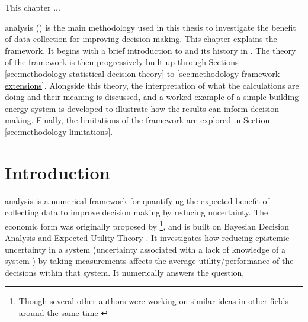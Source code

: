 \begin{cbox}{}
    This chapter ...\\


\end{cbox}

\newpage

\noindent
{} analysis () is the main methodology used in this thesis to investigate the benefit of data collection for improving decision making. This chapter explains the  framework. It begins with a brief introduction to  and its history in . The theory of the framework is then progressively built up through Sections \ref{sec:methodology-statistical-decision-theory} to \ref{sec:methodology-framework-extensions}. Alongside this theory, the interpretation of what the calculations are doing and their meaning is discussed, and a worked example of a simple building energy system is developed to illustrate how the results can inform decision making. Finally, the limitations of the framework are explored in Section \ref{sec:methodology-limitations}. %

\section{Introduction} \label{sec:methodology-intro}


 analysis is a numerical framework for quantifying the expected benefit of collecting data to improve decision making by reducing uncertainty. The economic form was originally proposed by \citep{raiffa1961AppliedStatisticalDecision}\footnote{Though several other authors were working on similar ideas in other fields around the same time \citep{howard1966InformationValueTheory,hurley1964MathematicalTheoryValue,spivey1968DecisionMakingProbabilistic,feltham1968ValueInformation,szaniawski1967ValuePerfectInformation}}, and is built on Bayesian Decision Analysis and Expected Utility Theory \citep{smith1945TheoryGamesEconomic}. It investigates how reducing epistemic uncertainty in a system (uncertainty associated with a lack of knowledge of a system \citep{zhang2021ValueInformationAnalysis}) by taking measurements affects the average utility/performance of the decisions within that system. It numerically answers the question,

